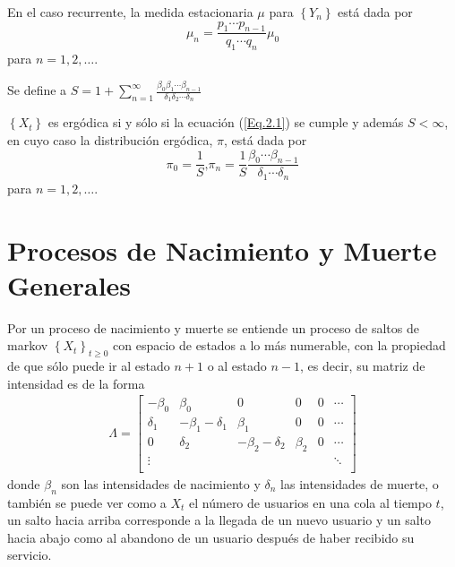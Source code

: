 \begin{Cor}\label{Cor.2.3}
En el caso recurrente, la medida estacionaria $\mu$ para
$\left\{Y_{n}\right\}$ est\'a dada por
\begin{equation}
\mu_{n}=\frac{p_{1}\cdots p_{n-1}}{q_{1}\cdots q_{n}}\mu_{0}
\end{equation}
para $n=1,2,\ldots$.
\end{Cor}

Se define a
$S=1+\sum_{n=1}^{\infty}\frac{\beta_{0}\beta_{1}\cdots\beta_{n-1}}{\delta_{1}\delta_{2}\cdots\delta_{n}}$

\begin{Cor}\label{Cor.2.4}
$\left\{X_{t}\right\}$ es erg\'odica si y s\'olo si la ecuaci\'on
(\ref{Eq.2.1}) se cumple y adem\'as $S<\infty$, en cuyo caso la
distribuci\'on erg\'odica, $\pi$, est\'a dada por
\begin{equation}\label{Eq.2.4}
\pi_{0}=\frac{1}{S}\textrm{,
}\pi_{n}=\frac{1}{S}\frac{\beta_{0}\cdots\beta_{n-1}}{\delta_{1}\cdots\delta_{n}}
\end{equation}
para $n=1,2,\ldots$.
\end{Cor}
\section{Procesos de Nacimiento y Muerte Generales}

Por un proceso de nacimiento y muerte se entiende un proceso de saltos de markov $\left\{X_{t}\right\}_{t\geq0}$ con espacio de estados a lo m\'as numerable, con la propiedad de que s\'olo puede ir al estado $n+1$ o al estado $n-1$, es decir, su matriz de intensidad es de la forma
\begin{eqnarray*}
\Lambda=\left[\begin{array}{cccccc}
-\beta_{0} & \beta_{0} & 0 &0 &0& \cdots\\
\delta_{1} & -\beta_{1}-\delta_{1} & \beta_{1} & 0 & 0 &\cdots\\
0 & \delta_{2} & -\beta_{2}-\delta_{2} & \beta_{2} & 0 &\cdots\\
\vdots & & & & & \ddots\\
\end{array}\right]
\end{eqnarray*}
donde $\beta_{n}$ son las intensidades de nacimiento y $\delta_{n}$ las intensidades de muerte, o tambi\'en se puede ver como a $X_{t}$ el n\'umero de usuarios en una cola al tiempo $t$, un salto hacia arriba corresponde a la llegada de un nuevo usuario y un salto hacia abajo como al abandono de un usuario despu\'es de haber recibido su servicio.

